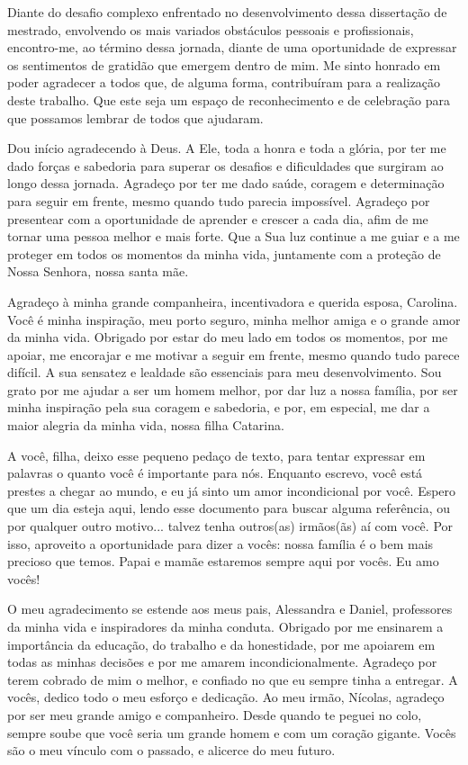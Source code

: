 \begin{agradecimentos}

    Diante do desafio complexo enfrentado no desenvolvimento dessa dissertação de mestrado, envolvendo os mais variados obstáculos pessoais e profissionais, encontro-me, ao término dessa jornada, diante de uma oportunidade de expressar os sentimentos de gratidão que emergem dentro de mim. Me sinto honrado em poder agradecer a todos que, de alguma forma, contribuíram para a realização deste trabalho. Que este seja um espaço de reconhecimento e de celebração para que possamos lembrar de todos que ajudaram.

    Dou início agradecendo à Deus. A Ele, toda a honra e toda a glória, por ter me dado forças e sabedoria para superar os desafios e dificuldades que surgiram ao longo dessa jornada. Agradeço por ter me dado saúde, coragem e determinação para seguir em frente, mesmo quando tudo parecia impossível. Agradeço por presentear com a oportunidade de aprender e crescer a cada dia, afim de me tornar uma pessoa melhor e mais forte. Que a Sua luz continue a me guiar e a me proteger em todos os momentos da minha vida, juntamente com a proteção de Nossa Senhora, nossa santa mãe.

    Agradeço à minha grande companheira, incentivadora e querida esposa, Carolina. Você é minha inspiração, meu porto seguro, minha melhor amiga e o grande amor da minha vida. Obrigado por estar do meu lado em todos os momentos, por me apoiar, me encorajar e me motivar a seguir em frente, mesmo quando tudo parece difícil. A sua sensatez e lealdade são essenciais para meu desenvolvimento. Sou grato por me ajudar a ser um homem melhor, por dar luz a nossa família, por ser minha inspiração pela sua coragem e sabedoria, e por, em especial, me dar a maior alegria da minha vida, nossa filha Catarina.

    A você, filha, deixo esse pequeno pedaço de texto, para tentar expressar em palavras o quanto você é importante para nós. Enquanto escrevo, você está prestes a chegar ao mundo, e eu já sinto um amor incondicional por você. Espero que um dia esteja aqui, lendo esse documento para buscar alguma referência, ou por qualquer outro motivo... talvez tenha outros(as) irmãos(ãs) aí com você. Por isso, aproveito a oportunidade para dizer a vocês: nossa família é o bem mais precioso que temos. Papai e mamãe estaremos sempre aqui por vocês. Eu amo vocês!

    O meu agradecimento se estende aos meus pais, Alessandra e Daniel, professores da minha vida e inspiradores da minha conduta. Obrigado por me ensinarem a importância da educação, do trabalho e da honestidade, por me apoiarem em todas as minhas decisões e por me amarem incondicionalmente. Agradeço por terem cobrado de mim o melhor, e confiado no que eu sempre tinha a entregar. A vocês, dedico todo o meu esforço e dedicação. Ao meu irmão, Nícolas, agradeço por ser meu grande amigo e companheiro. Desde quando te peguei no colo, sempre soube que você seria um grande homem e com um coração gigante. Vocês são o meu vínculo com o passado, e alicerce do meu futuro.


\end{agradecimentos}
